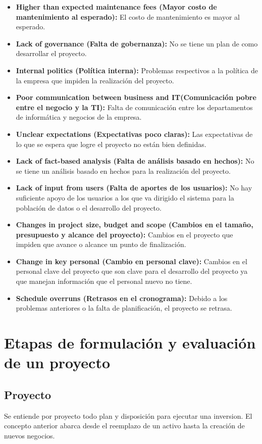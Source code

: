 \documentclass{templateNote}
\begin{document}
\begin{itemize}
    \item \textbf{Higher than expected maintenance fees (Mayor costo de mantenimiento al esperado):} El costo de mantenimiento es mayor al esperado.
    \item \textbf{Lack of governance (Falta de gobernanza):} No se tiene un plan de como desarrollar el proyecto.
    \item \textbf{Internal politics (Política interna):} Problemas respectivos a la política de la empresa que impiden la realización del proyecto.
    \item \textbf{Poor communication between business and IT(Comunicación pobre entre el negocio y la TI):} Falta de comunicación entre los departamentos de informática y negocios de la empresa.
    \item \textbf{Unclear expectations (Expectativas poco claras):} Las expectativas de lo que se espera que logre el proyecto no están bien definidas.
    \item \textbf{Lack of fact-based analysis (Falta de análisis basado en hechos):} No se tiene un análisis basado en hechos para la realización del proyecto.
    \item \textbf{Lack of input from users (Falta de aportes de los usuarios):} No hay suficiente apoyo de los usuarios a los que va dirigido el sistema para la población de datos o el desarrollo del proyecto.
    \item \textbf{Changes in project size, budget and scope (Cambios en el tamaño, presupuesto y alcance del proyecto):} Cambios en el proyecto que impiden que avance o alcance un punto de finalización.
    \item \textbf{Change in key personal (Cambio en personal clave):} Cambios en el personal clave del proyecto que son clave para el desarrollo del proyecto ya que manejan información que el personal nuevo no tiene.
    \item \textbf{Schedule overruns (Retrasos en el cronograma):} Debido a los problemas anteriores o la falta de planificación, el proyecto se retrasa.
\end{itemize}

\newpage
\section{Etapas de formulación y evaluación de un proyecto}

\subsection{Proyecto}
Se entiende por proyecto todo plan y disposición para ejecutar una inversion. El concepto anterior abarca desde el reemplazo de un activo hasta la creación de nuevos negocios.
\end{document}
